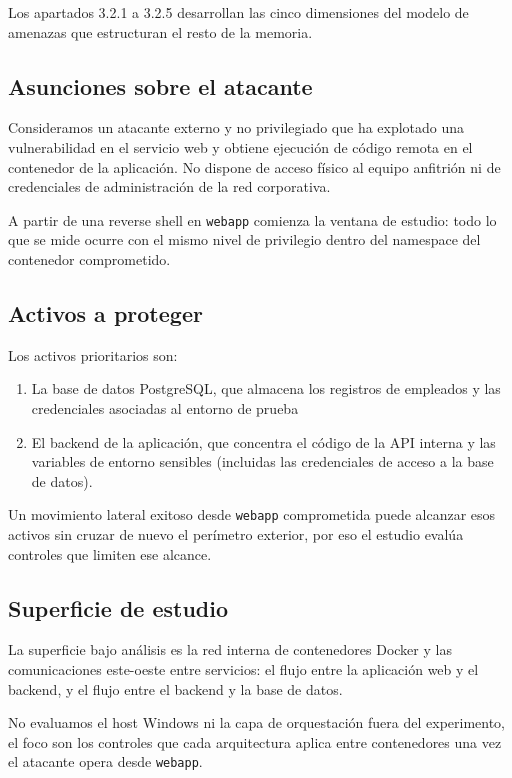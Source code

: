 \documentclass[11pt,spanish,listoffigures,listoftables]{tfgetsinf}
\begin{document}
    Los apartados 3.2.1 a 3.2.5 desarrollan las cinco dimensiones del modelo de amenazas que estructuran el resto de la memoria.
    
        \subsection{Asunciones sobre el atacante}
        Consideramos un atacante externo y no privilegiado que ha explotado una vulnerabilidad en el servicio web y obtiene ejecución de código remota en el contenedor de la aplicación. No dispone de acceso físico al equipo anfitrión ni de credenciales de administración de la red corporativa. 

        A partir de una reverse shell en \texttt{webapp} comienza la ventana de estudio: todo lo que se mide ocurre con el mismo nivel de privilegio dentro del namespace del contenedor comprometido.

        \subsection{Activos a proteger}
        Los activos prioritarios son: 
            \begin{enumerate}
                \item La base de datos PostgreSQL, que almacena los registros de empleados y las credenciales asociadas al entorno de prueba
                \item El backend de la aplicación, que concentra el código de la API interna y las variables de entorno sensibles (incluidas las credenciales de acceso a la base de datos).
            \end{enumerate}
            Un movimiento lateral exitoso desde \texttt{webapp} comprometida puede alcanzar esos activos sin cruzar de nuevo el perímetro exterior, por eso el estudio evalúa controles que limiten ese alcance.
            
        \subsection{Superficie de estudio}
        La superficie bajo análisis es la red interna de contenedores Docker y las comunicaciones este-oeste entre servicios: el flujo entre la aplicación web y el backend, y el flujo entre el backend y la base de datos. 

        No evaluamos el host Windows ni la capa de orquestación fuera del experimento, el foco son los controles que cada arquitectura aplica entre contenedores una vez el atacante opera desde \texttt{webapp}.
        
\end{document}

